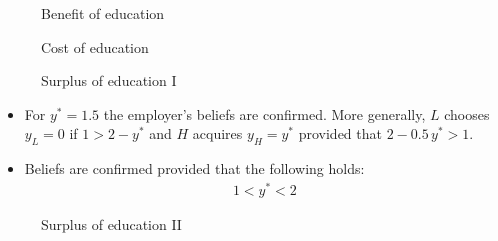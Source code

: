 \begin{frame}\begin{figure}[htp]\centering
\caption{Benefit of education}
\end{figure}\end{frame}
\begin{frame}\begin{figure}[htp]\centering
\caption{Cost of education}
\end{figure}\end{frame}
\begin{frame}\begin{figure}[htp]\centering
\caption{Surplus of education I}
\end{figure}\end{frame}
\begin{frame}
\begin{itemize}\setlength\itemsep{1em}
\item For $y^* = 1.5$ the employer's beliefs are confirmed. More generally, $L$ chooses $y_L = 0$ if $1 > 2 - y^*$ and $H$ acquires $y_H = y^*$ provided that $2 - 0.5\,y^* > 1$.
\item Beliefs are confirmed provided that the following holds:
	\begin{align*}
	1 < y^* < 2
	\end{align*}
\end{itemize}
\end{frame}
\begin{frame}\begin{figure}[htp]\centering
\caption{Surplus of education II}
\end{figure}\end{frame}

